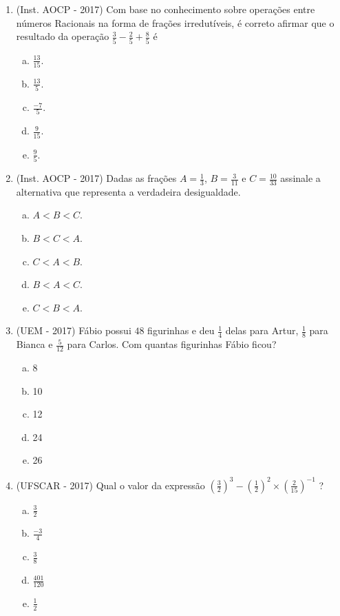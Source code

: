 \begin{enumerate}
  \item (Inst. AOCP - 2017) Com base no conhecimento sobre operações entre números Racionais na forma de frações irredutíveis, é correto afirmar que o resultado da operação $\frac{3}{5} - \frac{2}{5} + \frac{8}{5}$  é
  \begin{enumerate}[a)]
  \item $\frac{13}{15}$.
  \item $\frac{13}{5}$.
  \item $\frac{-7}{5}$.
  \item $\frac{9}{15}$.
  \item $\frac{9}{5}$.
  \end{enumerate}
  
  \item (Inst. AOCP - 2017) Dadas as frações $A= \frac{1}{3}$, $B= \frac{3}{11}$ e $C= \frac{10}{33}$ assinale a alternativa que representa a verdadeira desigualdade.
  \begin{enumerate}[a)]
  \item $A < B < C$.
  \item $B < C < A$.
  \item $C < A < B$.
  \item $B < A < C$.
  \item $C < B < A$.
  \end{enumerate}
  
  \item (UEM - 2017) Fábio possui $48$ figurinhas e deu $\frac{1}{4}$ delas para Artur, $\frac{1}{8}$ para Bianca e $\frac{5}{12}$ para Carlos. Com quantas figurinhas Fábio ficou?
  \begin{enumerate}[a)]
  \item 8
  \item 10
  \item 12
  \item 24
  \item 26
  \end{enumerate}
  
  \item (UFSCAR - 2017) Qual o valor da expressão $(\frac{3}{2})^3 - (\frac{1}{2})^2 \times (\frac{2}{15})^{-1}$ ?
  \begin{enumerate}[a)]
  \item $\frac{3}{2}$
  \item $\frac{-3}{4}$
  \item $\frac{3}{8}$
  \item $\frac{401}{120}$
  \item $\frac{1}{2}$
  \end{enumerate}
  

\end{enumerate}
